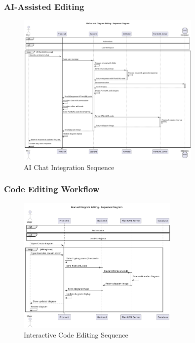 \subsubsection{AI-Assisted Editing}
\begin{figure}[H]
\centering
\includegraphics[width=0.8\textwidth]{conception/SprintIV/sequence_diagrams/sequence_workspaceManagement_5_3_ChatWithAIMode.png}
\caption{AI Chat Integration Sequence}
\end{figure}

\subsubsection{Code Editing Workflow}
\begin{figure}[H]
\centering
\includegraphics[width=0.7\textwidth]{conception/SprintIV/sequence_diagrams/sequence_workspaceManagement_5_2_EditDiagramCode.png}
\caption{Interactive Code Editing Sequence}
\end{figure}

